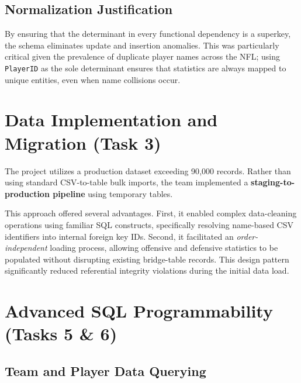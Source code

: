 \documentclass[conference]{IEEEtran}
\begin{document}
\subsection{Normalization Justification}

By ensuring that the determinant in every functional dependency is a superkey, the schema eliminates update and insertion anomalies. This was particularly critical given the prevalence of duplicate player names across the NFL; using \texttt{PlayerID} as the sole determinant ensures that statistics are always mapped to unique entities, even when name collisions occur.

\section{Data Implementation and Migration (Task 3)}

The project utilizes a production dataset exceeding 90{,}000 records. Rather than using standard CSV-to-table bulk imports, the team implemented a \textbf{staging-to-production pipeline} using temporary tables.

This approach offered several advantages. First, it enabled complex data-cleaning operations using familiar SQL constructs, specifically resolving name-based CSV identifiers into internal foreign key IDs. Second, it facilitated an \textit{order-independent} loading process, allowing offensive and defensive statistics to be populated without disrupting existing bridge-table records. This design pattern significantly reduced referential integrity violations during the initial data load.

\section{Advanced SQL Programmability (Tasks 5 \& 6)}

\subsection{Team and Player Data Querying}
\end{document}
